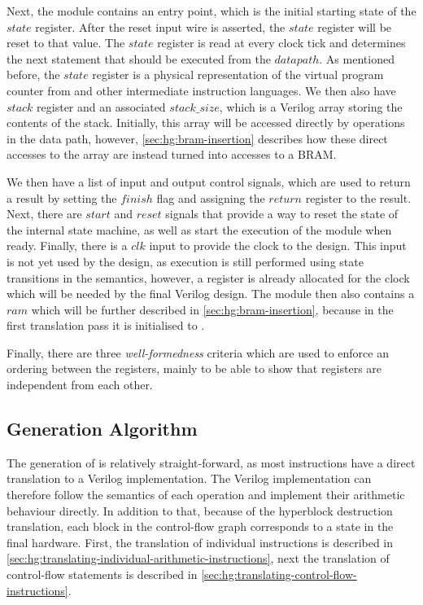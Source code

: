 Next, the \htl{} module contains an entry point, which is the initial starting
state of the $\mathit{state}$ register.  After the reset input wire is asserted,
the $\mathit{state}$ register will be reset to that value.  The $\mathit{state}$
register is read at every clock tick and determines the next statement that
should be executed from the $\mathit{datapath}$.  As mentioned before, the
$\mathit{state}$ register is a physical representation of the virtual program
counter from \rtlsubpar{} and other intermediate instruction languages.  We then
also have $\mathit{stack}$ register and an associated $\mathit{stack\_size}$,
which is a Verilog array storing the contents of the stack.  Initially, this
array will be accessed directly by operations in the data path, however,
\cref{sec:hg:bram-insertion} describes how these direct accesses to the array
are instead turned into accesses to a \gls{BRAM}.

We then have a list of input and output control signals, which are used to
return a result by setting the $\mathit{finish}$ flag and assigning the
$\mathit{return}$ register to the result.  Next, there are $\mathit{start}$ and
$\mathit{reset}$ signals that provide a way to reset the state of the internal
state machine, as well as start the execution of the module when ready.
Finally, there is a $\mathit{clk}$ input to provide the clock to the design.
This input is not yet used by the \htl{} design, as execution is still performed
using state transitions in the semantics, however, a register is already
allocated for the clock which will be needed by the final Verilog design.  The
module then also contains a $\mathit{ram}$ which will be further described in
\cref{sec:hg:bram-insertion}, because in the first translation pass it is
initialised to \cnone.

Finally, there are three \emph{well-formedness} criteria which are used to
enforce an ordering between the registers, mainly to be able to show that
registers are independent from each other.

\subsection{\htl{} Generation Algorithm}%
\label{sec:hg:htl-generation-algorithm}

The generation of \htl{} is relatively straight-forward, as most instructions
have a direct translation to a Verilog implementation.  The Verilog
implementation can therefore follow the semantics of each operation and
implement their arithmetic behaviour directly.  In addition to that, because of
the hyperblock destruction translation, each block in the control-flow graph
corresponds to a state in the final hardware.  First, the translation of
individual instructions is described in
\cref{sec:hg:translating-individual-arithmetic-instructions}, next the
translation of control-flow statements is described in
\cref{sec:hg:translating-control-flow-instructions}.

